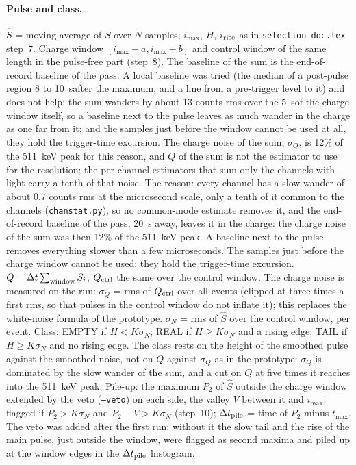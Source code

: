 \documentclass[11pt]{article}
\newcommand{\code}[1]{\texttt{#1}}
\newcommand{\us}{\textmu s}
\begin{document}
\paragraph{Pulse and class.} $\hat S$ = moving average of $S$ over $N$
samples; $i_{\max}$, $H$, $i_{\rm rise}$ as in \code{selection\_doc.tex}
step~7. Charge window $[i_{\max} - a, i_{\max} + b]$ and control window
of the same length in the pulse-free part (step~8). The baseline of the sum is the
end-of-record baseline of the pass. A local baseline was tried (the
median of a post-pulse region 8 to 10~\us after the maximum, and a line
from a pre-trigger level to it) and does not help: the sum wanders by
about 13 counts rms over the 5~\us of the charge window itself, so a
baseline next to the pulse leaves as much wander in the charge as one far
from it; and the samples just before the window cannot be used at all,
they hold the trigger-time excursion. The charge noise of the sum,
$\sigma_Q$, is 12\% of the 511~keV peak for this reason, and $Q$ of the
sum is not the estimator to use for the resolution; the per-channel
estimators that sum only the channels with light carry a tenth of that
noise. The reason: every channel has a
slow wander of about 0.7 counts rms at the microsecond scale, only a tenth
of it common to the channels (\code{chanstat.py}), so no common-mode
estimate removes it, and the end-of-record baseline of the pass, 20~\us
away, leaves it in the charge: the charge noise of the sum was then 12\%
of the 511~keV peak. A baseline next to the pulse removes everything slower
than a few microseconds. The samples just before the charge window cannot
be used: they hold the trigger-time excursion. $Q = \Delta t \sum_{\rm
window} S_i$, $Q_{\rm ctrl}$ the same over the control window. The charge
noise is measured on the run: $\sigma_Q$ = rms of $Q_{\rm ctrl}$ over all
events (clipped at three times a first rms, so that pulses in the control
window do not inflate it); this replaces the white-noise formula of the
prototype. $\sigma_N$ = rms of $\hat S$ over the control window, per event.
Class: EMPTY if $H < K\sigma_N$; REAL if $H \ge K\sigma_N$ and a rising
edge; TAIL if $H \ge K\sigma_N$ and no rising edge. The class rests on the
height of the smoothed pulse against the smoothed noise, not on $Q$
against $\sigma_Q$ as in the prototype: $\sigma_Q$ is dominated by the
slow wander of the sum, and a cut on $Q$ at five times it reaches into the
511~keV peak. Pile-up: the maximum
$P_2$ of $\hat S$ outside the charge window extended by the veto
(\code{--veto}) on each side, the valley $V$ between it and $i_{\max}$;
flagged if $P_2 > K\sigma_N$ and $P_2 - V > K\sigma_N$ (step~10); $\Delta
t_{\rm pile}$ = time of $P_2$ minus $t_{\max}$. The veto was added after
the first run: without it the slow tail and the rise of the main pulse,
just outside the window, were flagged as second maxima and piled up at the
window edges in the $\Delta t_{\rm pile}$ histogram.
\end{document}
